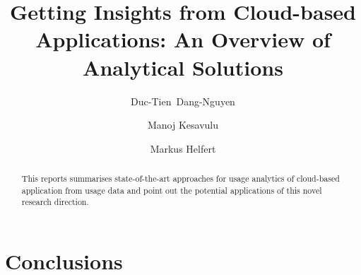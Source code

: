 \documentclass{llncs}
\begin{document}
\title{Getting Insights from Cloud-based Applications: An Overview of Analytical Solutions}


\author{Duc-Tien~Dang-Nguyen \and Manoj Kesavulu \and Markus Helfert }


\maketitle

\setcounter{footnote}{0}

\begin{abstract}
This reports summarises state-of-the-art approaches for usage analytics of cloud-based application from usage data and point out the potential applications of this novel research direction.
\end{abstract}











\section{Conclusions}





%
%
%
\end{document}

